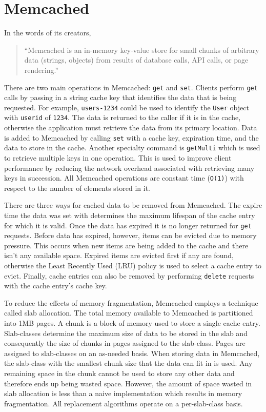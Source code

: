 \documentclass[12pt]{ucthesis}
\begin{document}
\section{Memcached}
In the words of its creators, \begin{quotation}``Memcached is an in-memory key-value store for small chunks of arbitrary data (strings, objects) from results of database calls, API calls, or page rendering\cite{memcachedDotOrg}.''\end{quotation}
There are two main operations in \textsf{Memcached}: {\tt get} and {\tt set}.
Clients perform {\tt get} calls by passing in a string cache key that identifies the data that is being requested.
For example, {\tt users-1234} could be used to identify the {\tt User} object with {\tt userid} of {\tt 1234}.
The data is returned to the caller if it is in the cache, otherwise the application must retrieve the data from its primary location.
Data is added to \textsf{Memcached} by calling {\tt set} with a cache key, expiration time, and the data to store in the cache.
Another specialty command is {\tt getMulti} which is used to retrieve multiple keys in one operation.
This is used to improve client performance by reducing the network overhead associated with retrieving many keys in succession.
All \textsf{Memcached} operations are constant time ({\tt O(1)}) with respect to the number of elements stored in it.

There are three ways for cached data to be removed from \textsf{Memcached}.
The expire time the data was set with determines the maximum lifespan of the cache entry for which it is valid.
Once the data has expired it is no longer returned for {\tt get} requests.
Before data has expired, however, items can be evicted due to memory pressure.
This occurs when new items are being added to the cache and there isn't any available space.
Expired items are evicted first if any are found, otherwise the Least Recently Used (LRU) policy is used to select a cache entry to evict.
Finally, cache entries can also be removed by performing {\tt delete} requests with the cache entry's cache key.

To reduce the effects of memory fragmentation, \textsf{Memcached} employs a technique called slab allocation.
The total memory available to \textsf{Memcached} is partitioned into 1MB pages.
A chunk is a block of memory used to store a single cache entry.
Slab-classes determine the maximum size of data to be stored in the slab and consequently the size of chunks in pages assigned to the slab-class.
Pages are assigned to slab-classes on an as-needed basis.
When storing data in \textsf{Memcached}, the slab-class with the smallest chunk size that the data can fit in is used.
Any remaining space in the chunk cannot be used to store any other data and therefore ends up being wasted space.
However, the amount of space wasted in slab allocation is less than a naive implementation which results in memory fragmentation.
All replacement algorithms operate on a per-slab-class basis.
\end{document}
